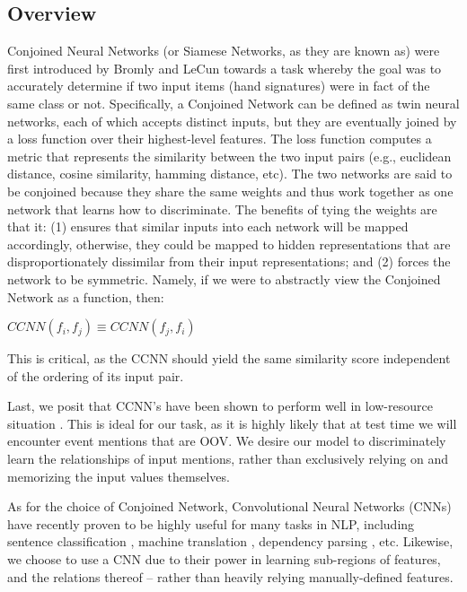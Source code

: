 \documentclass[11pt,a4paper]{article}
\begin{document}
\subsection{Overview}
Conjoined Neural Networks (or Siamese Networks, as they are known as) were first introduced by Bromly and LeCun  towards a task whereby the goal was to accurately determine if two input items (hand signatures) were in fact of the same class or not.  Specifically, a Conjoined Network can be defined as twin neural networks, each of which accepts distinct inputs, but they are eventually joined by a loss function over their highest-level features.  The loss function computes a metric that represents the similarity between the two input pairs (e.g., euclidean distance, cosine similarity, hamming distance, etc).  The two networks are said to be conjoined because they share the same weights and thus work together as one network that learns how to discriminate.  The benefits of tying the weights are that it: (1) ensures that similar inputs into each network will be mapped accordingly, otherwise, they could be mapped to hidden representations that are disproportionately dissimilar from their input representations; and (2) forces the network to be symmetric.  Namely, if we were to abstractly view the Conjoined Network as a function, then:

\vspace{4mm}

 $CCNN(f_i,f_j) \equiv CCNN(f_j,f_i)$

\vspace{4mm}

This is critical, as the CCNN should yield the same similarity score independent of the ordering of its input pair.

Last, we posit that CCNN's have been shown to perform well in low-resource situation \cite{Koch2015SiameseNN}.  This is ideal for our task, as it is highly likely that at test time we will encounter event mentions that are OOV.  We desire our model to discriminately learn the relationships of input mentions, rather than exclusively relying on and memorizing the input values themselves.

As for the choice of Conjoined Network, Convolutional Neural Networks (CNNs) have recently proven to be highly useful for many tasks in NLP, including sentence classification \cite{DBLP:conf/emnlp/Kim14}, machine translation \cite{DBLP:conf/acl/GehringAGD17}, dependency parsing \cite{DBLP:journals/corr/YuV17}, etc.  Likewise, we choose to use a CNN due to their power in learning sub-regions of features, and the relations thereof -- rather than heavily relying manually-defined features.
\end{document}
